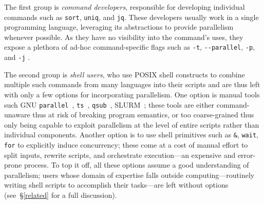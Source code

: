 \documentclass[letterpaper,twocolumn,10pt]{article}
\newcommand{\ttt}[1]{\texttt{#1}}
\newcommand{\nv}[1]{[{\color{cyan}nv: #1}]}
\newcommand{\kk}[1]{[{\color{magenta}kk: #1}]}
\begin{document}
The first group is \emph{command developers}, responsible for developing individual commands such as \ttt{sort}, \ttt{uniq}, and \ttt{jq}.
These developers usually work in a single programming language, leveraging its abstractions to provide parallelism whenever possible.
As they have no visibility into the command's uses, they expose a plethora of ad-hoc command-specific flags such as \ttt{-t}, \ttt{-}\ttt{-parallel}, \ttt{-p}, and \ttt{-j} %
\cite{pasetto2011comparative, mcilroy1993engineering, stallman1991gnu}.

The second group is \emph{shell users}, who use POSIX shell constructs to combine multiple such commands from many languages into their scripts and are thus left with only a few options for incorporating parallelism.
One option is manual tools such GNU \ttt{parallel}~\cite{Tange2011a}, \ttt{ts}~\cite{tsp}, \ttt{qsub}~\cite{gentzsch2001sun}, \textsc{SLURM}~\cite{yoo2003slurm};
  these tools are either command-unaware thus at risk of breaking program semantics, or too coarse-grained thus only being capable to exploit parallelism at the level of entire scripts rather than individual components.
Another option is to use shell primitives such as \ttt{\&}, \ttt{wait}, \ttt{for} to explicitly induce concurrency;
 these come at a cost of manual effort to split inputs, rewrite scripts, and orchestrate execution---an expensive and error-prone process.
To top it off, all these options assume a good understanding of parallelism;
  users whose domain of expertise falls outside computing---routinely writing shell scripts to accomplish their tasks---are left without options (see~\S\ref{related} for a full discussion).
\end{document}
